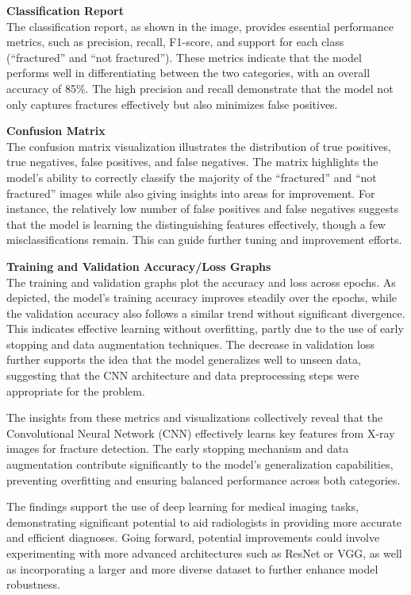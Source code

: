 \documentclass[11pt]{article}
\begin{document}
\textbf{Classification Report}\\
The classification report, as shown in the image, provides essential
performance metrics, such as precision, recall, F1-score, and support
for each class (``fractured'' and ``not fractured''). These metrics
indicate that the model performs well in differentiating between the two
categories, with an overall accuracy of 85\%. The high precision and
recall demonstrate that the model not only captures fractures
effectively but also minimizes false positives.

\textbf{ Confusion Matrix}\\
The confusion matrix visualization illustrates the distribution of true
positives, true negatives, false positives, and false negatives. The
matrix highlights the model's ability to correctly classify the majority
of the ``fractured'' and ``not fractured'' images while also giving
insights into areas for improvement. For instance, the relatively low
number of false positives and false negatives suggests that the model is
learning the distinguishing features effectively, though a few
misclassifications remain. This can guide further tuning and improvement
efforts.

\textbf{ Training and Validation Accuracy/Loss Graphs}\\
The training and validation graphs plot the accuracy and loss across
epochs. As depicted, the model's training accuracy improves steadily
over the epochs, while the validation accuracy also follows a similar
trend without significant divergence. This indicates effective learning
without overfitting, partly due to the use of early stopping and data
augmentation techniques. The decrease in validation loss further
supports the idea that the model generalizes well to unseen data,
suggesting that the CNN architecture and data preprocessing steps were
appropriate for the problem.

The insights from these metrics and visualizations collectively reveal
that the Convolutional Neural Network (CNN) effectively learns key
features from X-ray images for fracture detection. The early stopping
mechanism and data augmentation contribute significantly to the model's
generalization capabilities, preventing overfitting and ensuring
balanced performance across both categories.

The findings support the use of deep learning for medical imaging tasks,
demonstrating significant potential to aid radiologists in providing
more accurate and efficient diagnoses. Going forward, potential
improvements could involve experimenting with more advanced
architectures such as ResNet or VGG, as well as incorporating a larger
and more diverse dataset to further enhance model robustness.
\end{document}

